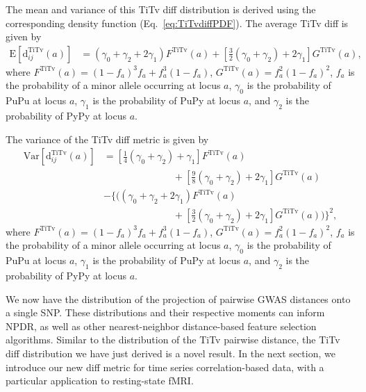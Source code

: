 \documentclass[aoas]{imsart}
\begin{document}
The mean and variance of this TiTv diff distribution is derived using the corresponding density function (Eq.~\ref{eq:TiTvdiffPDF}). The average TiTv diff is given by
%
\begin{equation}\label{eq:TiTvdiffMean}
\begin{aligned}
\text{E}\left[\text{d}^\text{TiTv}_{ij}(a)\right] &= (\gamma_0 + \gamma_2 + 2\gamma_1)F^\text{TiTv}(a) + \left[\frac{3}{2}(\gamma_0 + \gamma_2) + 2\gamma_1\right] G^\text{TiTv}(a),
\end{aligned}
\end{equation}
%
where $F^\text{TiTv}(a) = \left(1 - f_a\right)^3 f_a + f^3_a \left(1 - f_a\right)$, $G^\text{TiTv}(a) = f^2_a \left(1 - f_a\right)^2$, $f_a$ is the probability of a minor allele occurring at locus $a$, $\gamma_0$ is the probability of PuPu at locus $a$, $\gamma_1$ is the probability of PuPy at locus $a$, and $\gamma_2$ is the probability of PyPy at locus $a$.

The variance of the TiTv diff metric is given by
%
\begin{equation}\label{eq:TiTvdiffVar}
\begin{aligned}
\text{Var}\left[\text{d}^\text{TiTv}_{ij}(a)\right] &= \left[\frac{1}{4}(\gamma_0 + \gamma_2) + \gamma_1\right] F^\text{TiTv}(a) \\
&\hspace{3cm}+ \left[\frac{9}{8}(\gamma_0 + \gamma_2) + 2\gamma_1\right] G^\text{TiTv}(a) \\
&- {\Biggl\{}{\biggl(}(\gamma_0 + \gamma_2 + 2\gamma_1)F^\text{TiTv}(a) \\
&\hspace{3cm}+ \left[\frac{3}{2}(\gamma_0 + \gamma_2) + 2\gamma_1\right] G^\text{TiTv}(a){\biggr)}{\Biggr\}}^2,
\end{aligned}
\end{equation}
%
where $F^\text{TiTv}(a) = \left(1 - f_a\right)^3 f_a + f^3_a \left(1 - f_a\right)$, $G^\text{TiTv}(a) = f^2_a \left(1 - f_a\right)^2$, $f_a$ is the probability of a minor allele occurring at locus $a$, $\gamma_0$ is the probability of PuPu at locus $a$, $\gamma_1$ is the probability of PuPy at locus $a$, and $\gamma_2$ is the probability of PyPy at locus $a$.

We now have the distribution of the projection of pairwise GWAS distances onto a single SNP. These distributions and their respective moments can inform NPDR, as well as other nearest-neighbor distance-based feature selection algorithms. Similar to the distribution of the TiTv pairwise distance, the TiTv diff distribution we have just derived is a novel result. In the next section, we introduce our new diff metric for time series correlation-based data, with a particular application to resting-state fMRI.
\end{document}
